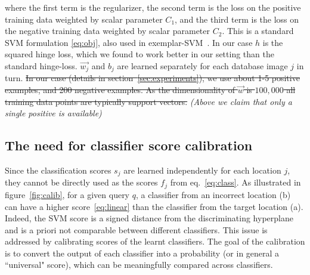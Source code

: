      \noindent
      where the first term is the regularizer, the second term is the loss on the positive training data weighted by scalar parameter $C_1$, and the third term is the loss on the negative training data weighted by scalar parameter $C_2$.   
      This is a standard SVM formulation \eqref{eq:obj}, also used in exemplar-SVM~\cite{Malisiewicz11}.
      In our case $h$ is the squared hinge loss, which we found to work better in our setting than the standard hinge-loss. $\vec{w_j}$ and $b_j$ are learned separately for each database image $j$ in turn. 
      \sout{
      In our case (details in section~\ref{sec:experiments}), we use about 1-5 positive examples, and 200 negative examples. As the dimensionality of $\vec{w}$ is $100,000$ all training data points are typically support vectors. 
      }
      \textcolor{myGrey}{
        \emph{(Above we claim that only a single positive is available)}
      }
      

   \subsection{The need for classifier score calibration}
   Since the classification scores $s_j$ are learned independently for each location $j$, they cannot be directly used as the scores $f_j$ from eq.~\eqref{eq:class}. As illustrated in figure~\ref{fig:calib}, for a given query $q$, a classifier from an incorrect location (b) can have a higher score~\eqref{eq:linear} than the classifier from the target location (a). Indeed, the SVM score is a signed distance from the discriminating hyperplane and is a priori not comparable between different classifiers. This issue is addressed by calibrating scores of the learnt classifiers. The goal of the calibration is to convert the output of each classifier into a probability (or in general a ``universal" score), which can be meaningfully compared across classifiers. 


